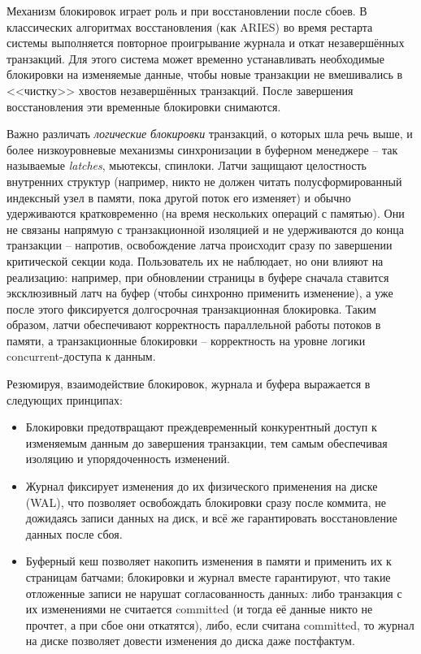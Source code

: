  Механизм блокировок играет роль и при восстановлении после сбоев. В классических алгоритмах восстановления (как ARIES) во время рестарта системы выполняется повторное проигрывание журнала и откат незавершённых транзакций. Для этого система может временно устанавливать необходимые блокировки на изменяемые данные, чтобы новые транзакции не вмешивались в <<чистку>> хвостов незавершённых транзакций. После завершения восстановления эти временные блокировки снимаются. 

 Важно различать \textit{логические блокировки} транзакций, о которых шла речь выше, и более низкоуровневые механизмы синхронизации в буферном менеджере – так называемые \textit{latches}, мьютексы, спинлоки. Латчи защищают целостность внутренних структур (например, никто не должен читать полусформированный индексный узел в памяти, пока другой поток его изменяет) и обычно удерживаются кратковременно (на время нескольких операций с памятью). Они не связаны напрямую с транзакционной изоляцией и не удерживаются до конца транзакции – напротив, освобождение латча происходит сразу по завершении критической секции кода. Пользователь их не наблюдает, но они влияют на реализацию: например, при обновлении страницы в буфере сначала ставится эксклюзивный латч на буфер (чтобы синхронно применить изменение), а уже после этого фиксируется долгосрочная транзакционная блокировка. Таким образом, латчи обеспечивают корректность параллельной работы потоков в памяти, а транзакционные блокировки – корректность на уровне логики concurrent-доступа к данным. 

 Резюмируя, взаимодействие блокировок, журнала и буфера выражается в следующих принципах:
 \begin{itemize}
    \item Блокировки предотвращают преждевременный конкурентный доступ к изменяемым данным до завершения транзакции, тем самым обеспечивая изоляцию и упорядоченность изменений.
    \item Журнал фиксирует изменения до их физического применения на диске (WAL), что позволяет освобождать блокировки сразу после коммита, не дожидаясь записи данных на диск, и всё же гарантировать восстановление данных после сбоя.
    \item Буферный кеш позволяет накопить изменения в памяти и применить их к страницам батчами; блокировки и журнал вместе гарантируют, что такие отложенные записи не нарушат согласованность данных: либо транзакция с их изменениями не считается committed (и тогда её данные никто не прочтет, а при сбое они откатятся), либо, если считана committed, то журнал на диске позволяет довести изменения до диска даже постфактум.
 \end{itemize}


